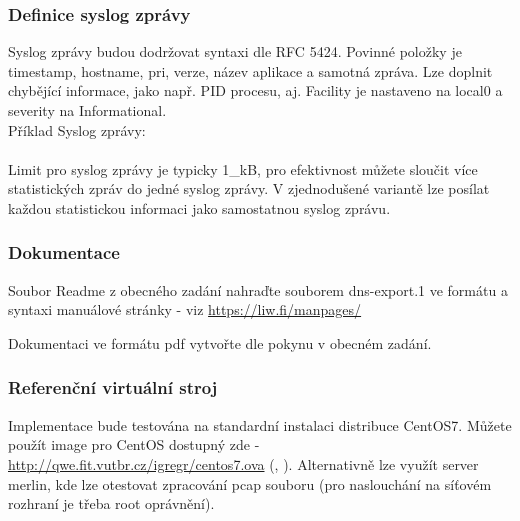 \documentclass[11pt, a4paper, titlepage]{article}
\begin{document}
\subsubsection*{Definice syslog zprávy}

Syslog zprávy budou dodržovat syntaxi dle RFC 5424. Povinné položky je timestamp, hostname, pri, verze, název aplikace a samotná zpráva. Lze doplnit chybějící informace, jako např. PID procesu, aj. Facility je nastaveno na local0 a severity na Informational. \\

Příklad Syslog zprávy: \\
 \\

Limit pro syslog zprávy je typicky 1\_kB, pro efektivnost můžete sloučit více statistických zpráv do jedné syslog zprávy. V zjednodušené variantě lze posílat každou statistickou informaci jako samostatnou syslog zprávu.


\subsubsection*{Dokumentace}

Soubor Readme z obecného zadání nahraďte souborem dns-export.1 ve formátu a syntaxi manuálové stránky - viz \url{https://liw.fi/manpages/}

Dokumentaci ve formátu pdf vytvořte dle pokynu v obecném zadání.


\subsubsection*{Referenční virtuální stroj}

Implementace bude testována na standardní instalaci distribuce CentOS7. Můžete použít image pro CentOS dostupný zde - \url{http://qwe.fit.vutbr.cz/igregr/centos7.ova} (, ). Alternativně lze využít server merlin, kde lze otestovat zpracování pcap souboru (pro naslouchání na síťovém rozhraní je třeba root oprávnění).

\end{document}
